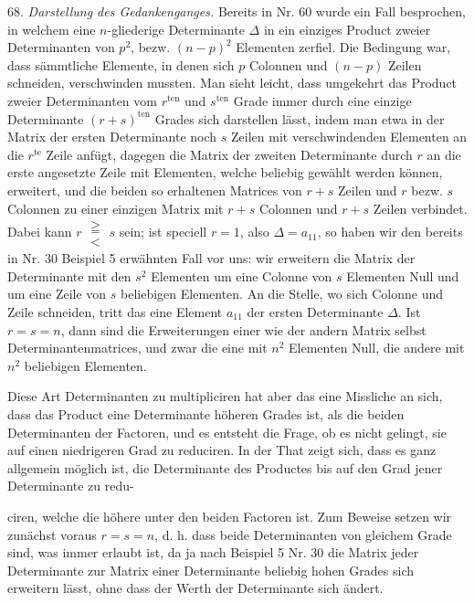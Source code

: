 \documentclass[11pt]{article}
\providecommand{\weberpage}[1]{}
\let\Delta\varDelta
\begin{document}
68. \textit{Darstellung des Gedankenganges.} Bereits in Nr. 60 wurde ein
Fall besprochen, in welchem eine $n$-gliederige Determinante $\Delta$ in ein
einziges Product zweier Determinanten von $p^2$, bezw. $(n-p)^2$ Elementen
zerfiel. Die Bedingung war, dass sämmtliche Elemente, in denen sich $p$
Colonnen und $(n-p)$ Zeilen schneiden, verschwinden mussten. Man sieht
leicht, dass umgekehrt das Product zweier Determinanten vom $r^{\text{ten}}$
und $s^{\text{ten}}$ Grade immer durch eine einzige Determinante
$(r+s)^{\text{ten}}$ Grades sich darstellen lässt, indem man etwa in der
Matrix der ersten Determinante noch $s$ Zeilen mit verschwindenden
Elementen an die $r^{\text{te}}$ Zeile anfügt, dagegen die Matrix der
zweiten Determinante durch $r$ an die erste angesetzte Zeile mit
Elementen, welche beliebig gewählt werden können, erweitert, und die
beiden so erhaltenen Matrices von $r+s$ Zeilen und $r$ bezw. $s$ Colonnen
zu einer einzigen Matrix mit $r+s$ Colonnen und $r+s$ Zeilen verbindet.
Dabei kann $r\;\begin{smallmatrix}\geqq\\<\end{smallmatrix}\;s$ sein; %
ist speciell $r=1$, also $\Delta = a_{11}$, so haben wir den bereits in Nr. 30
Beispiel 5 erwähnten Fall vor uns: wir erweitern die Matrix der
Determinante mit den $s^2$ Elementen um eine Colonne von $s$ Elementen
Null und um eine Zeile von $s$ beliebigen Elementen. An die Stelle, wo
sich Colonne und Zeile schneiden, tritt das eine Element $a_{11}$ der
ersten Determinante $\Delta$. Ist $r=s=n$, dann sind die Erweiterungen
einer wie der andern Matrix selbst Determinantenmatrices, und zwar die
eine mit $n^2$ Elementen Null, die andere mit $n^2$ beliebigen Elementen.

Diese Art Determinanten zu multipliciren hat aber das eine Missliche an
sich, dass das Product eine Determinante höheren Grades ist, als die
beiden Determinanten der Factoren, und es entsteht die Frage, ob es
nicht gelingt, sie auf einen niedrigeren Grad zu reduciren. In der That
zeigt sich, dass es ganz allgemein möglich ist, die Determinante des
Productes bis auf den Grad jener Determinante zu redu-


\weberpage{74}
ciren, welche die höhere unter den beiden Factoren ist. Zum Beweise
setzen wir zunächst voraus $r=s=n$, d. h. dass beide Determinanten von
gleichem Grade sind, was immer erlaubt ist, da ja nach Beispiel 5 Nr. 30
die Matrix jeder Determinante zur Matrix einer Determinante beliebig
hohen Grades sich erweitern lässt, ohne dass der Werth der Determinante
sich ändert.
\end{document}
